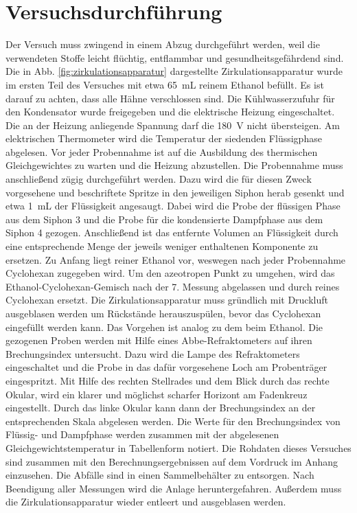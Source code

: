 
\section{Versuchsdurchführung}
\label{sec:durchfuerung}

Der Versuch muss zwingend in einem Abzug durchgeführt werden, weil die verwendeten Stoffe leicht flüchtig, entflammbar und gesundheitsgefährdend sind. Die in Abb. \ref{fig:zirkulationsapparatur} dargestellte Zirkulationsapparatur wurde im ersten Teil des Versuches mit etwa \SI{65}{\milli\liter} reinem Ethanol befüllt. Es ist darauf zu achten, dass alle Hähne verschlossen sind. Die Kühlwasserzufuhr für den Kondensator wurde freigegeben und die elektrische Heizung eingeschaltet. Die an der Heizung anliegende Spannung darf die \SI{180}{\volt} nicht übersteigen. Am elektrischen Thermometer wird die Temperatur der siedenden Flüssigphase abgelesen. Vor jeder Probennahme ist auf die Ausbildung des thermischen Gleichgewichtes zu warten und die Heizung abzustellen. Die Probennahme muss anschließend zügig durchgeführt werden. Dazu wird die für diesen Zweck vorgesehene und beschriftete Spritze in den jeweiligen Siphon herab gesenkt und etwa \SI{1}{\milli\liter} der Flüssigkeit angesaugt. Dabei wird die Probe der flüssigen Phase aus dem Siphon 3 und die Probe für die kondensierte Dampfphase aus dem Siphon 4 gezogen. Anschließend ist das entfernte Volumen an Flüssigkeit durch eine entsprechende Menge der jeweils weniger enthaltenen Komponente zu ersetzen. Zu Anfang liegt reiner Ethanol vor, weswegen nach jeder Probennahme Cyclohexan zugegeben wird. Um den azeotropen Punkt zu umgehen, wird das Ethanol-Cyclohexan-Gemisch nach der 7. Messung abgelassen und durch reines Cyclohexan ersetzt. Die Zirkulationsapparatur muss gründlich mit Druckluft ausgeblasen werden um Rückstände herauszuspülen, bevor das Cyclohexan eingefüllt werden kann. Das Vorgehen ist analog zu dem beim Ethanol. Die gezogenen Proben werden mit Hilfe eines Abbe-Refraktometers auf ihren Brechungsindex untersucht. Dazu wird die Lampe des Refraktometers eingeschaltet und die Probe in das dafür vorgesehene Loch am Probenträger eingespritzt. Mit Hilfe des rechten Stellrades und dem Blick durch das rechte Okular, wird ein klarer und möglichst scharfer Horizont am Fadenkreuz eingestellt. Durch das linke Okular kann dann der Brechungsindex an der entsprechenden Skala abgelesen werden. Die Werte für den Brechungsindex von Flüssig- und Dampfphase werden zusammen mit der abgelesenen Gleichgewichtstemperatur in Tabellenform notiert. Die Rohdaten dieses Versuches sind zusammen mit den Berechnungsergebnissen auf dem Vordruck im Anhang einzusehen.
Die Abfälle sind in einen Sammelbehälter zu entsorgen. Nach Beendigung aller Messungen wird die Anlage heruntergefahren. Außerdem muss die Zirkulationsapparatur wieder entleert und ausgeblasen werden.
